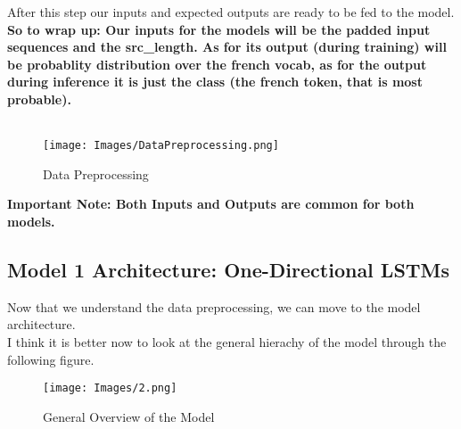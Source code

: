 \documentclass{article}
\begin{document}
After this step our inputs and expected outputs are ready to be fed to the model. \\ 
\textbf{So to wrap up: Our inputs for the models will be the padded input sequences and the src\_length. As for its output (during training) will be probablity distribution over the french vocab, as for the output during inference it is just the class (the french token, that is most probable).}\\ \\ 
\begin{figure}[H]
    \centering
    \texttt{[image: Images/DataPreprocessing.png]}
    \caption{Data Preprocessing}
\end{figure}
\textbf{Important Note: Both Inputs and Outputs are common for both models.}
\subsection{Model 1 Architecture: One-Directional LSTMs }
Now that we understand the data preprocessing, we can move to the model architecture.\\
I think it is better now to look at the general hierachy of the model through the following figure.\\
\begin{figure}[H]
    \centering
    \texttt{[image: Images/2.png]}
    \caption{General Overview of the Model}
\end{figure}
\end{document}
